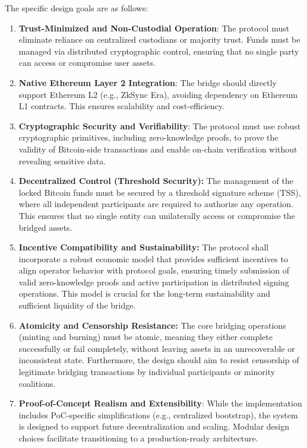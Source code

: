 \documentclass{DESSThesis}
\begin{document}
The specific design goals are as follows:

\begin{enumerate}
    \item \textbf{Trust-Minimized and Non-Custodial Operation}: The protocol must eliminate reliance on centralized custodians or majority trust. Funds must be managed via distributed cryptographic control, ensuring that no single party can access or compromise user assets.

    \item \textbf{Native Ethereum Layer 2 Integration}: The bridge should directly support Ethereum L2 (e.g., ZkSync Era), avoiding dependency on Ethereum L1 contracts. This ensures scalability and cost-efficiency.

    \item \textbf{Cryptographic Security and Verifiability}: The protocol must use robust cryptographic primitives, including zero-knowledge proofs, to prove the validity of Bitcoin-side transactions and enable on-chain verification without revealing sensitive data.
    
	\item \textbf{Decentralized Control (Threshold Security):} The management of the locked Bitcoin funds must be secured by a threshold signature scheme (TSS), where all independent participants are required to authorize any operation. This ensures that no single entity can unilaterally access or compromise the bridged assets.

	\item \textbf{Incentive Compatibility and Sustainability:} The protocol shall incorporate a robust economic model that provides sufficient incentives to align operator behavior with protocol goals, ensuring timely submission of valid zero-knowledge proofs and active participation in distributed signing operations. This model is crucial for the long-term sustainability and sufficient liquidity of the bridge.
	
	\item \textbf{Atomicity and Censorship Resistance:} The core bridging operations (minting and burning) must be atomic, meaning they either complete successfully or fail completely, without leaving assets in an unrecoverable or inconsistent state. Furthermore, the design should aim to resist censorship of legitimate bridging transactions by individual participants or minority coalitions.

    \item \textbf{Proof-of-Concept Realism and Extensibility}: While the implementation includes PoC-specific simplifications (e.g., centralized bootstrap), the system is designed to support future decentralization and scaling. Modular design choices facilitate transitioning to a production-ready architecture.

\end{enumerate}
\end{document}
